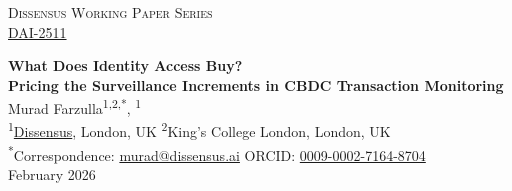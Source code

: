 \documentclass[11pt]{article}
\newcommand{\papernum}{DAI-2511}              %
\newcommand{\paperdate}{February 2026}
\newcommand{\paperurl}{https://systems.ac/2/DAI-2511}  %
\begin{document}
\thispagestyle{firstpage}

\begin{center}
{\small\textsc{Dissensus Working Paper Series}}\\[0.2em]
{\small \href{\paperurl}{\papernum}}
\end{center}

\vspace{1.5em}

\begin{center}
{\LARGE\bfseries What Does Identity Access Buy?\\Pricing the Surveillance Increments in CBDC Transaction Monitoring}\\[1.5em]

{\large Murad Farzulla}\textsuperscript{1,2,*}, \textsuperscript{1}\\[0.8em]

{\small
  \textsuperscript{1}\href{https://dissensus.ai}{Dissensus}, London, UK \quad
  \textsuperscript{2}King's College London, London, UK%
}\\[0.5em]

{\footnotesize
  \textsuperscript{*}Correspondence: \href{mailto:murad@dissensus.ai}{murad@dissensus.ai}
  \quad
  ORCID: \href{https://orcid.org/0009-0002-7164-8704}{0009-0002-7164-8704}%
}\\[0.3em]
{\footnotesize \paperdate}
\end{center}
\end{document}
